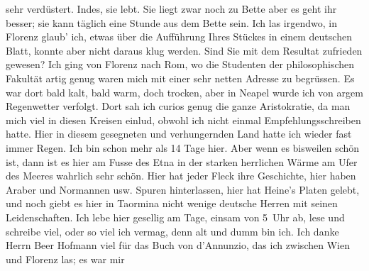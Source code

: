 \begin{ledgroupsized}[t]{13cm}
               sehr {\pb}verdüstert. Indes, sie lebt.
               Sie liegt zwar noch zu Bette aber es geht ihr besser; sie kann täglich eine Stunde
               aus dem Bette sein.\pend
           \pstart
           Ich las irgendwo, in Florenz glaub’ ich, etwas
               über die Aufführung Ihres Stückes in einem deutschen Blatt, konnte aber nicht daraus klug werden. Sind
               Sie mit dem Resultat zufrieden gewesen?\pend
           \pstart
           Ich ging von Florenz nach Rom, wo die Studenten der philosophischen Fakultät artig genug waren mich mit einer sehr netten
               Adresse zu begrüssen. Es war dort bald kalt, bald warm, doch trocken, aber in Neapel wurde ich von argem Regenwetter verfolgt.
               Dort sah ich curios genug die ganze Aristokratie, da man mich {\pb}viel in diesen Kreisen einlud,
               obwohl ich nicht einmal Empfehlungsschreiben hatte.\pend
           \pstart
           Hier in diesem gesegneten und verhungernden Land hatte ich wieder fast immer Regen.
               Ich bin schon mehr als 14 Tage hier. Aber wenn es bisweilen schön ist, dann ist es
               hier am Fusse des Etna in der starken herrlichen
               Wärme am Ufer des Meeres wahrlich sehr schön. Hier hat jeder Fleck ihre Geschichte,
               hier haben Araber und Normannen usw. Spuren hinterlassen, hier hat Heine’s Platen gelebt, und noch giebt es hier in Taormina nicht wenige deutsche Herren mit seinen Leidenschaften.\pend
           \pstart
           Ich lebe hier gesellig am Tage, einsam {\pb}von 5 Uhr ab, lese und schreibe
               viel, oder so viel ich vermag, denn alt und dumm bin ich.\pend
           \pstart
           Ich danke Herrn Beer Hofmann viel für das Buch von d’Annunzio, das ich zwischen Wien und Florenz las; es war mir

\end{ledgroupsized}
